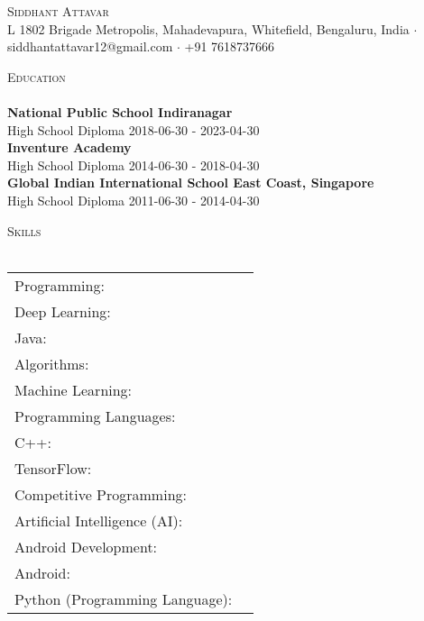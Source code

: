 \documentclass[a4paper]{article}
\newcommand{\lineunder} {
    \vspace*{-8pt} \\
    \hspace*{-18pt} \hrulefill \\
}
\newcommand{\header} [1] {
    {\hspace*{-18pt}\vspace*{6pt} \textsc{#1}}
    \vspace*{-6pt} \lineunder
}
\begin{document}
\vspace*{-40pt}

    

\vspace*{-10pt}
\begin{center}
	{\Huge \scshape {Siddhant Attavar}}\\
	L 1802 Brigade Metropolis, Mahadevapura, Whitefield, Bengaluru, India $\cdot$ siddhantattavar12@gmail.com $\cdot$ +91 7618737666\\
\end{center}

\header{Education}
\textbf{National Public School Indiranagar}\\
High School Diploma \hfill 2018-06-30 - 2023-04-30\\
\vspace{2mm}
\textbf{Inventure Academy}\\
High School Diploma \hfill 2014-06-30 - 2018-04-30\\
\vspace{2mm}
\textbf{Global Indian International School East Coast, Singapore}\\
High School Diploma \hfill 2011-06-30 - 2014-04-30\\
\vspace{2mm}



\header{Skills}
\begin{tabular}{ l l }
	Programming:                   &   \\
	Deep Learning:                 &   \\
	Java:                          &   \\
	Algorithms:                    &   \\
	Machine Learning:              &   \\
	Programming Languages:         &   \\
	C++:                           &   \\
	TensorFlow:                    &   \\
	Competitive Programming:       &   \\
	Artificial Intelligence (AI):  &   \\
	Android Development:           &   \\
	Android:                       &   \\
	Python (Programming Language): &   \\
\end{tabular}
\vspace{2mm}
\end{document}
